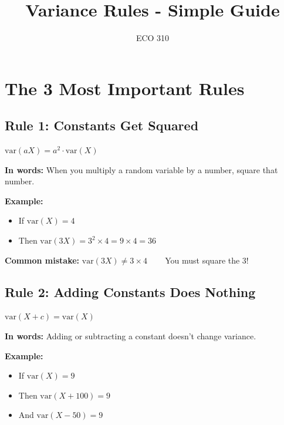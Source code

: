 \documentclass[12pt]{article}
\title{\LARGE Variance Rules - Simple Guide}
\author{ECO 310}
\date{}
\begin{document}
\maketitle

\section*{\Large The 3 Most Important Rules}

\subsection*{\large Rule 1: Constants Get Squared}

\begin{center}
\colorbox{yellow!30}{
\Large
$\text{var}(aX) = a^2 \cdot \text{var}(X)$
}
\end{center}

\textbf{In words:} When you multiply a random variable by a number, square that number.

\vspace{1em}

\textbf{Example:}
\begin{itemize}[leftmargin=2cm]
    \item If $\text{var}(X) = 4$
    \item Then $\text{var}(3X) = 3^2 \times 4 = 9 \times 4 = 36$
\end{itemize}

\vspace{1em}

\textbf{Common mistake:} $\text{var}(3X) \neq 3 \times 4$ ~~~ You must square the 3!

\vspace{2em}

\subsection*{\large Rule 2: Adding Constants Does Nothing}

\begin{center}
\colorbox{yellow!30}{
\Large
$\text{var}(X + c) = \text{var}(X)$
}
\end{center}

\textbf{In words:} Adding or subtracting a constant doesn't change variance.

\vspace{1em}

\textbf{Example:}
\begin{itemize}[leftmargin=2cm]
    \item If $\text{var}(X) = 9$
    \item Then $\text{var}(X + 100) = 9$
    \item And $\text{var}(X - 50) = 9$
\end{itemize}
\end{document}
